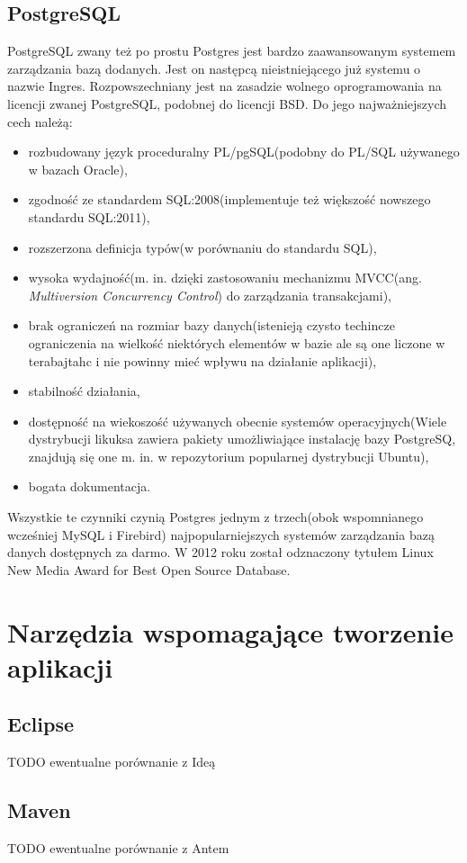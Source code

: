 \subsection[PostgreSQL][PostgreSQL]{PostgreSQL} 
PostgreSQL zwany też po prostu Postgres jest bardzo zaawansowanym systemem zarządzania bazą dodanych. Jest on następcą nieistniejącego już systemu o nazwie Ingres. Rozpowszechniany jest na zasadzie wolnego oprogramowania na licencji zwanej PostgreSQL, podobnej do licencji BSD. Do jego najważniejszych cech należą:
\begin{itemize}
	\item rozbudowany język proceduralny PL/pgSQL(podobny do PL/SQL używanego w bazach Oracle),
	\item zgodność ze standardem SQL:2008(implementuje też większość nowszego standardu SQL:2011),
	\item rozszerzona definicja typów(w porównaniu do standardu SQL),
	\item wysoka wydajność(m. in. dzięki zastosowaniu mechanizmu MVCC(ang. \textit{Multiversion Concurrency Control}) do zarządzania transakcjami),
	\item brak ograniczeń na rozmiar bazy danych(istenieją czysto techincze ograniczenia na wielkość niektórych elementów w bazie ale są one liczone w terabajtahc i nie powinny mieć wpływu na działanie aplikacji),
	\item stabilność działania,
	\item dostępność na wiekoszość używanych obecnie systemów operacyjnych(Wiele dystrybucji likuksa zawiera pakiety umożliwiające instalację bazy PostgreSQ, znajdują się one m. in. w repozytorium popularnej dystrybucji Ubuntu),
	\item bogata dokumentacja.
\end{itemize}
Wszystkie te czynniki czynią Postgres jednym z trzech(obok wspomnianego wcześniej MySQL i Firebird) najpopularniejszych systemów zarządzania bazą danych dostępnych za darmo. W 2012 roku został odznaczony tytułem Linux New Media Award for Best Open Source Database.

\section[Narzędzia wspomagające tworzenie aplikacji][Narzędzia wspomagające tworzenie aplikacji]{Narzędzia wspomagające tworzenie aplikacji}

\subsection[Eclipse][Eclipse]{Eclipse}
TODO ewentualne porównanie z Ideą

\subsection[Maven][Maven]{Maven}
TODO ewentualne porównanie z Antem
